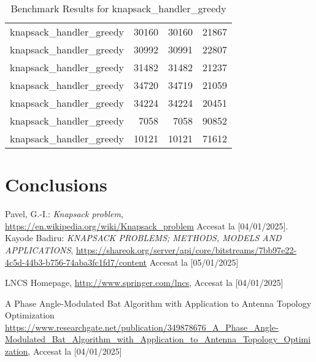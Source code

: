 \documentclass[runningheads]{llncs}
\begin{document}
\begin{table}[h]
\begin{tabular}{@{}lrrr@{}}
        knapsack\_handler\_greedy & 30160 & 30160 & 21867 \\
        knapsack\_handler\_greedy & 30992 & 30991 & 22807 \\
        knapsack\_handler\_greedy & 31482 & 31482 & 21237 \\
        knapsack\_handler\_greedy & 34720 & 34719 & 21059 \\
        knapsack\_handler\_greedy & 34224 & 34224 & 20451 \\
        knapsack\_handler\_greedy & 7058 & 7058 & 90852 \\
        knapsack\_handler\_greedy & 10121 & 10121 & 71612 \\
        \bottomrule
    \end{tabular}
    \caption{Benchmark Results for knapsack\_handler\_greedy}
\end{table}
\clearpage








\section{Conclusions}

%
%
%
% 
% 
%
\begin{thebibliography}{8}
Pavel, G.-I.: \emph{Knapsack problem}, \url{https://en.wikipedia.org/wiki/Knapsack_problem} Accesat la [04/01/2025].
Kayode Badiru: \emph{KNAPSACK PROBLEMS; METHODS, MODELS AND APPLICATIONS},
\url{https://shareok.org/server/api/core/bitstreams/7bb97e22-4c5d-44b3-b756-74aba3fc1fd7/content} 
Accesat la [05/01/2025]

LNCS Homepage, \url{http://www.springer.com/lncs}, Accesat la [04/01/2025]

A Phase Angle-Modulated Bat Algorithm with Application to Antenna Topology Optimization
\url{https://www.researchgate.net/publication/349878676_A_Phase_Angle-Modulated_Bat_Algorithm_with_Application_to_Antenna_Topology_Optimization}, Accesat la [04/01/2025]

\end{thebibliography}
\end{document}
